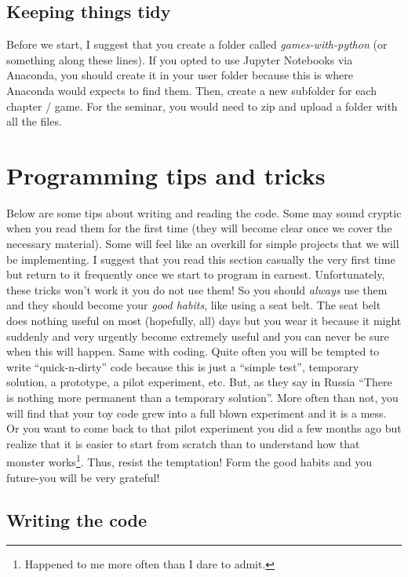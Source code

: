 \documentclass[
]{book}
\begin{document}
\hypertarget{files-folder}{%
\section{Keeping things tidy}\label{files-folder}}

Before we start, I suggest that you create a folder called \emph{games-with-python} (or something along these lines). If you opted to use Jupyter Notebooks via Anaconda, you should create it in your user folder because this is where Anaconda would expects to find them. Then, create a new subfolder for each chapter / game. For the seminar, you would need to zip and upload a folder with all the files.

\hypertarget{programming-tips}{%
\chapter{Programming tips and tricks}\label{programming-tips}}

Below are some tips about writing and reading the code. Some may sound cryptic when you read them for the first time (they will become clear once we cover the necessary material). Some will feel like an overkill for simple projects that we will be implementing. I suggest that you read this section casually the very first time but return to it frequently once we start to program in earnest. Unfortunately, these tricks won't work it you do not use them! So you should \emph{always} use them and they should become your \emph{good habits}, like using a seat belt. The seat belt does nothing useful on most (hopefully, all) days but you wear it because it might suddenly and very urgently become extremely useful and you can never be sure when this will happen. Same with coding. Quite often you will be tempted to write ``quick-n-dirty'' code because this is just a ``simple test'', temporary solution, a prototype, a pilot experiment, etc. But, as they say in Russia ``There is nothing more permanent than a temporary solution''. More often than not, you will find that your toy code grew into a full blown experiment and it is a mess. Or you want to come back to that pilot experiment you did a few months ago but realize that it is easier to start from scratch than to understand how that monster works\footnote{Happened to me more often than I dare to admit.}. Thus, resist the temptation! Form the good habits and you future-you will be very grateful!

\hypertarget{writing-tips}{%
\section{Writing the code}\label{writing-tips}}
\end{document}
